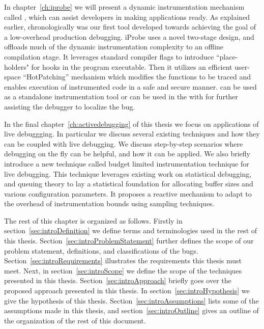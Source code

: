In chapter~\ref{ch:iprobe} we will present a dynamic instrumentation mechanism called \iprobe, which can assist developers in making applications \parikshan ready.
As explained earlier, chronologically \iprobe was our first tool developed towards achieving the goal of a low-overhead production debugging.
iProbe uses a novel two-stage design, and offloads much of the dynamic instrumentation complexity to an offline compilation stage.
It leverages standard compiler flags to introduce ``place-holders" for hooks in the program executable.
Then it utilizes an efficient user-space ``HotPatching'' mechanism which modifies the functions to be traced and enables execution of instrumented code in a safe and secure manner.
\iprobe can be used as a standalone instrumentation tool or can be used in the \debugcontainer with \parikshan for further assisting the debugger to localize the bug.

In the final chapter~\ref{ch:activedebugging} of this thesis we focus on applications of live debuggging. 
In particular we discuss several existing techniques and how they can be coupled with live debugging. 
We discuss step-by-step scenarios where debugging on the fly can be helpful, and how it can be applied.
We also briefly introduce a new technique called budget limited instrumentation technique for live debugging.
This technique leverages existing work on statistical debugging, and queuing theory to lay a statistical foundation for allocating buffer sizes and various configuration parameters.
It proposes a reactive mechanism to adapt to the overhead of instrumentation bounds using sampling techniques.


The rest of this chapter is organized as follows.
Firstly in section~\ref{sec:introDefinition} we define terms and terminologies used in the rest of this thesis.
Section~\ref{sec:introProblemStatement} further defines the scope of our problem statement, definitions, and classifications of the bugs.
Section~\ref{sec:introRequirements} illustrates the requirements this thesis must meet.
Next, in section~\ref{sec:introScope} we define the scope of the techniques presented in this thesis.
Section~\ref{sec:introApproach} briefly goes over the proposed approach presented in this thesis.
In section~\ref{sec:introHypothesis} we give the hypothesis of this thesis.
Section~\ref{sec:introAssumptions} lists some of the assumptions made in this thesis, and section~\ref{sec:introOutline} gives an outline of the organization of the rest of this document.

